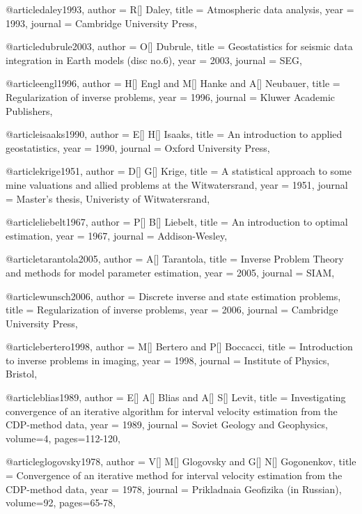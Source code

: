 @article{daley1993,
  author =	 {R[] Daley},
  title =	 {Atmospheric data analysis},
  year =	 1993,
  journal =	 {Cambridge University Press},
}

@article{dubrule2003,
  author =	 {O[] Dubrule},
  title =	 {Geostatistics for seismic data integration in Earth models (disc no.6)},
  year =	 2003,
  journal =	 {SEG},
}

@article{engl1996,
  author =	 {H[] Engl and M[] Hanke and A[] Neubauer},
  title =	 {Regularization of inverse problems},
  year =	 1996,
  journal =	 {Kluwer Academic Publishers},
}

@article{isaaks1990,
  author =	 {E[] H[] Isaaks},
  title =	 {An introduction to applied geostatistics},
  year =	 1990,
  journal =	 {Oxford University Press},
}

@article{krige1951,
  author =	 {D[] G[] Krige},
  title =	 {A statistical approach to some mine valuations and allied problems at the Witwatersrand},
  year =	 1951,
  journal =	 {Master's thesis, Univeristy of Witwatersrand},
}

@article{liebelt1967,
  author =	 {P[] B[] Liebelt},
  title =	 {An introduction to optimal estimation},
  year =	 1967,
  journal =	 {Addison-Wesley},
}

@article{tarantola2005,
  author =	 {A[] Tarantola},
  title =	 {Inverse Problem Theory and methods for model parameter estimation},
  year =	 2005,
  journal =	 {SIAM},
}

@article{wunsch2006,
  author =	 {Discrete inverse and state estimation problems},
  title =	 {Regularization of inverse problems},
  year =	 2006,
  journal =	 {Cambridge University Press},
}


@article{bertero1998,
  author =	 {M[] Bertero and P[] Boccacci},
  title =	 {Introduction to inverse problems in imaging},
  year =	 1998,
  journal =	 {Institute of Physics, Bristol},
}

@article{blias1989,
  author =	 {E[] A[] Blias and A[] S[] Levit},
  title =	 {Investigating convergence of an iterative algorithm for interval velocity estimation from the CDP-method data},
  year =	 1989,
  journal =	 {Soviet Geology and Geophysics},
  volume={4},
 pages=112-120,
}


@article{glogovsky1978,
  author =	 {V[] M[] Glogovsky and G[] N[] Gogonenkov},
  title =	 {Convergence of an iterative method for interval velocity estimation from the CDP-method data},
  year =	 1978,
  journal =	 {Prikladnaia Geofizika (in Russian)},
  volume={92},
 pages=65-78,
}


